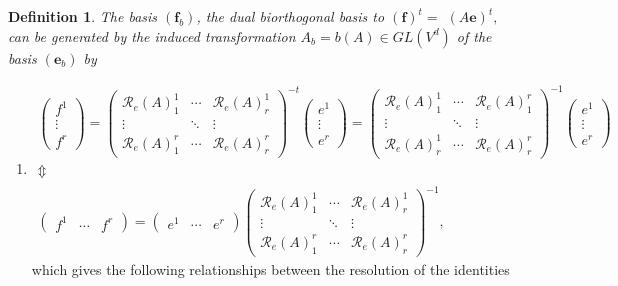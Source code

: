 \documentclass[aps,preprint]{revtex4}
\newtheorem{definition}[theorem]{Definition}
\begin{document}
\begin{definition}
\label{Definition of induced biorthogonality preseving transformation} The
basis $\left( \boldsymbol{f}_{b}\right) $, the dual biorthogonal basis to $%
\left( \boldsymbol{f}\right) ^{t}=$ $\left( A\boldsymbol{e}\right) ^{t},$
can be generated by the induced transformation $A_{b}=b\left( A\right) \in
GL\left( V^{d}\right) $ of the basis $\left( \boldsymbol{e}_{b}\right) $ by
\end{definition}

\begin{enumerate}
\item 
\begin{gather}
\left( 
\begin{array}{c}
f^{1} \\ 
\vdots \\ 
f^{r}%
\end{array}%
\right) =\left( 
\begin{array}{ccc}
\mathcal{R}_{e}\left( A\right) _{1}^{1} & \cdots & \mathcal{R}_{e}\left(
A\right) _{r}^{1} \\ 
\vdots & \ddots & \vdots \\ 
\mathcal{R}_{e}\left( A\right) _{1}^{r} & \cdots & \mathcal{R}_{e}\left(
A\right) _{r}^{r}%
\end{array}%
\right) ^{-t}\left( 
\begin{array}{c}
e^{1} \\ 
\vdots \\ 
e^{r}%
\end{array}%
\right) =\left( 
\begin{array}{ccc}
\mathcal{R}_{e}\left( A\right) _{1}^{1} & \cdots & \mathcal{R}_{e}\left(
A\right) _{1}^{r} \\ 
\vdots & \ddots & \vdots \\ 
\mathcal{R}_{e}\left( A\right) _{r}^{1} & \cdots & \mathcal{R}_{e}\left(
A\right) _{r}^{r}%
\end{array}%
\right) ^{-1}\left( 
\begin{array}{c}
e^{1} \\ 
\vdots \\ 
e^{r}%
\end{array}%
\right) \\
\Updownarrow \\
\left( 
\begin{array}{ccc}
f^{1} & \cdots & f^{r}%
\end{array}%
\right) =\left( 
\begin{array}{ccc}
e^{1} & \cdots & e^{r}%
\end{array}%
\right) \left( 
\begin{array}{ccc}
\mathcal{R}_{e}\left( A\right) _{1}^{1} & \cdots & \mathcal{R}_{e}\left(
A\right) _{r}^{1} \\ 
\vdots & \ddots & \vdots \\ 
\mathcal{R}_{e}\left( A\right) _{1}^{r} & \cdots & \mathcal{R}_{e}\left(
A\right) _{r}^{r}%
\end{array}%
\right) ^{-1},
\end{gather}%
which gives the following relationships between the resolution of the
identities


\end{enumerate}
\end{document}
